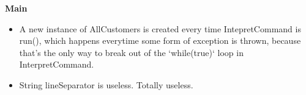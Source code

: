 \textbf{Main}
\begin{itemize}
    \item A new instance of AllCustomers is created every time IntepretCommand is run(), which happens everytime some form of exception is thrown, because that's the only way to break out of the `while(true)` loop in InterpretCommand. 
    \item String lineSeparator is useless. Totally useless.
\end{itemize}






  


    





